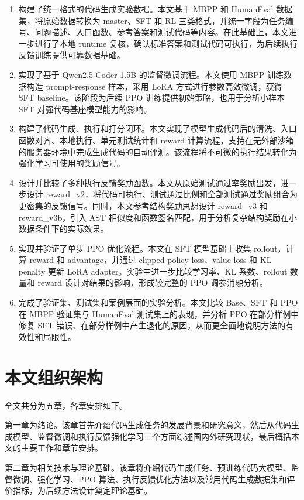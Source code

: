 \begin{enumerate}
  \item 构建了统一格式的代码生成实验数据。本文基于 MBPP 和 HumanEval 数据集，将原始数据转换为 master、SFT 和 RL 三类格式，并统一字段为任务编号、问题描述、入口函数、参考答案和测试代码等内容。在此基础上，本文进一步进行了本地 runtime 复核，确认标准答案和测试代码可执行，为后续执行反馈训练提供可靠数据基础。
  \item 实现了基于 Qwen2.5-Coder-1.5B 的监督微调流程。本文使用 MBPP 训练数据构造 prompt-response 样本，采用 LoRA 方式进行参数高效微调，获得 SFT baseline。该阶段为后续 PPO 训练提供初始策略，也用于分析小样本 SFT 对强代码基座模型能力的影响。
  \item 构建了代码生成、执行和打分闭环。本文实现了模型生成代码后的清洗、入口函数对齐、本地执行、单元测试统计和 reward 计算流程，支持在无外部沙箱的服务器环境中完成生成代码的自动评测。该流程将不可微的执行结果转化为强化学习可使用的奖励信号。
  \item 设计并比较了多种执行反馈奖励函数。本文从原始测试通过率奖励出发，进一步设计 reward\_v2，将代码可执行、测试通过比例和全部测试通过奖励组合为更密集的反馈信号。同时，本文参考结构奖励思想设计 reward\_v3 和 reward\_v3b，引入 AST 相似度和函数签名匹配，用于分析复杂结构奖励在小数据条件下的实际效果。
  \item 实现并验证了单步 PPO 优化流程。本文在 SFT 模型基础上收集 rollout，计算 reward 和 advantage，并通过 clipped policy loss、value loss 和 KL penalty 更新 LoRA adapter。实验中进一步比较学习率、KL 系数、rollout 数量和 reward 设计对结果的影响，形成较完整的 PPO 调参消融分析。
  \item 完成了验证集、测试集和案例层面的实验分析。本文比较 Base、SFT 和 PPO 在 MBPP 验证集与 HumanEval 测试集上的表现，并分析 PPO 在部分样例中修复 SFT 错误、在部分样例中产生退化的原因，从而更全面地说明方法的有效性和局限性。
\end{enumerate}

\section{本文组织架构}

全文共分为五章，各章安排如下。

第一章为绪论。该章首先介绍代码生成任务的发展背景和研究意义，然后从代码生成模型、监督微调和执行反馈强化学习三个方面综述国内外研究现状，最后概括本文的主要工作和章节安排。

第二章为相关技术与理论基础。该章将介绍代码生成任务、预训练代码大模型、监督微调、强化学习、PPO 算法、执行反馈优化方法以及常用代码生成数据集和评价指标，为后续方法设计奠定理论基础。

